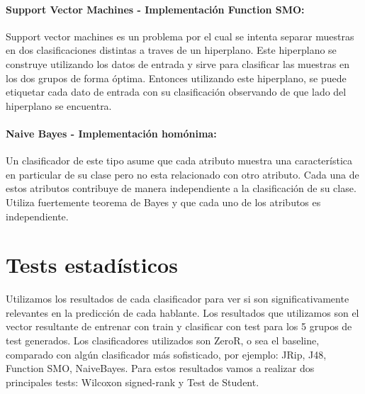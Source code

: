 \paragraph{Support Vector Machines \cite{Platt98sequentialminimal} - Implementación Function SMO:}


Support vector machines es un problema por el cual se intenta separar muestras en dos clasificaciones distintas a traves de un hiperplano. Este hiperplano se construye utilizando los datos de entrada y sirve para clasificar las muestras en los dos grupos de forma óptima. Entonces utilizando este hiperplano, se puede etiquetar cada dato de entrada con su clasificación observando de que lado del hiperplano se encuentra.

\paragraph{Naive Bayes \cite{DBLP:conf/flairs/Zhang04} - Implementación homónima:}


Un clasificador de este tipo asume que cada atributo muestra una característica en particular de su clase pero no esta relacionado con otro atributo. Cada una de estos atributos contribuye de manera independiente a la clasificación de su clase. Utiliza fuertemente teorema de Bayes y que cada uno de los atributos es independiente. 

\section{Tests estadísticos}

Utilizamos los resultados de cada clasificador para ver si son significativamente relevantes en la predicción de cada hablante. Los resultados que utilizamos son el vector resultante de entrenar con train y clasificar con test para los 5 grupos de test generados. Los clasificadores utilizados son ZeroR, o sea el baseline, comparado con algún clasificador más sofisticado, por ejemplo: JRip, J48, Function SMO, NaiveBayes. Para estos resultados vamos a realizar dos principales tests: Wilcoxon signed-rank y Test de Student. 

